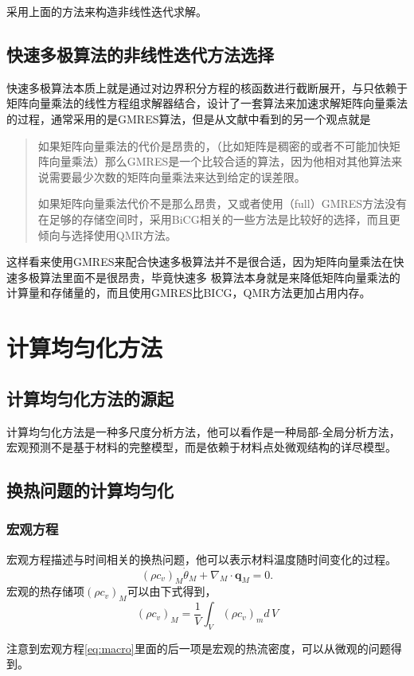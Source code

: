 采用上面的方法来构造非线性迭代求解。

\subsection{快速多极算法的非线性迭代方法选择}

快速多极算法本质上就是通过对边界积分方程的核函数进行截断展开，与只依赖于矩阵向量乘法的线性方程组求解器结合，设计了一套算法来加速求解矩阵向量乘法的过程，通常采用的是GMRES算法，但是从文献中看到的另一个观点就是
\begin{quote}
	\kaishu
如果矩阵向量乘法的代价是昂贵的，（比如矩阵是稠密的或者不可能加快矩阵向量乘法）那么GMRES是一个比较合适的算法，因为他相对其他算法来说需要最少次数的矩阵向量乘法来达到给定的误差限。

如果矩阵向量乘法代价不是那么昂贵，又或者使用（full）GMRES方法没有在足够的存储空间时，采用BiCG相关的一些方法是比较好的选择，而且更倾向与选择使用QMR方法。
	
\end{quote}

这样看来使用GMRES来配合快速多极算法并不是很合适，因为矩阵向量乘法在快速多极算法里面不是很昂贵，毕竟快速多
极算法本身就是来降低矩阵向量乘法的计算量和存储量的，而且使用GMRES比BICG，QMR方法更加占用内存。

\section{计算均匀化方法}

\subsection{计算均匀化方法的源起}
计算均匀化方法是一种多尺度分析方法\cite{ozdemir2008computational,Geers20102175}，他可以看作是一种局部-全局分析方法，
宏观预测不是基于材料的完整模型，而是依赖于材料点处微观结构的详尽模型。

\subsection{换热问题的计算均匀化}
\subsubsection{宏观方程}
宏观方程描述与时间相关的换热问题，他可以表示材料温度随时间变化的过程。
\begin{equation}
	(\rho c_v)_M \dot{\theta}_M + \nabla_M \cdot \mathbf{q}_M = 0.
	\label{eq:macro}
\end{equation}
宏观的热存储项$(\rho c_v)_M$可以由下式得到，
\begin{equation}
	(\rho c_v)_M = \frac{1}{V}\int_V (\rho c_v)_m d\,V
\end{equation}
\begin{remark}	
	注意到宏观方程\eqref{eq:macro}里面的后一项是宏观的热流密度，可以从微观的问题得到。
\end{remark}

